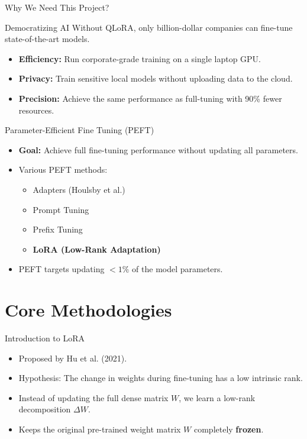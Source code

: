 \documentclass[aspectratio=169]{beamer}
\begin{document}
\begin{frame}{Why We Need This Project?}
    \begin{block}{Democratizing AI}
        Without QLoRA, only billion-dollar companies can fine-tune state-of-the-art models.
    \end{block}
    \begin{itemize}
        \item \textbf{Efficiency:} Run corporate-grade training on a single laptop GPU.
        \item \textbf{Privacy:} Train sensitive local models without uploading data to the cloud.
        \item \textbf{Precision:} Achieve the same performance as full-tuning with 90\% fewer resources.
    \end{itemize}
\end{frame}

\begin{frame}{Parameter-Efficient Fine Tuning (PEFT)}
    \begin{itemize}
        \item \textbf{Goal:} Achieve full fine-tuning performance without updating all parameters.
        \item Various PEFT methods:
        \begin{itemize}
            \item Adapters (Houlsby et al.)
            \item Prompt Tuning
            \item Prefix Tuning
            \item \textbf{LoRA (Low-Rank Adaptation)}
        \end{itemize}
        \item PEFT targets updating $<1\%$ of the model parameters.
    \end{itemize}
\end{frame}

\section{Core Methodologies}

\begin{frame}{Introduction to LoRA}
    \begin{itemize}
        \item Proposed by Hu et al. (2021).
        \item Hypothesis: The change in weights during fine-tuning has a low intrinsic rank.
        \item Instead of updating the full dense matrix $W$, we learn a low-rank decomposition $\Delta W$.
        \item Keeps the original pre-trained weight matrix $W$ completely \textbf{frozen}.
    \end{itemize}
\end{frame}
\end{document}
